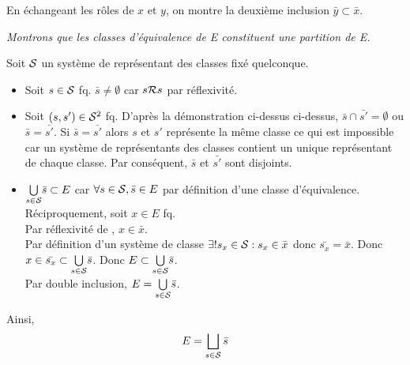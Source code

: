 \documentclass{article}
\renewenvironment{question_kholle}[2][ ]
{
	\subsection{\texorpdfstring{#2}{}}
	\notblank{#1}
	{
		\noindent #1
		\bigbreak
	}
	{}
	\begin{proof}
}
{
	\end{proof}
}
\begin{document}
\begin{question_kholle}
\begin{itemize}[label=\textemdash]
          En échangeant les rôles de $x$ et $y$, on montre la deuxième inclusion $\bar{y} \subset \bar{x}$.
  \end{itemize}
  \bigbreak

  \textit{Montrons que les classes d'équivalence de E constituent une partition de E.}

  Soit $\mathcal S$ un système de représentant des classes fixé quelconque.

  \begin{itemize}[label=\textemdash]
    \item Soit $s\in \mathcal S$ fq. $\bar{s} \neq \emptyset$ car $s \mathcal R s$ par réflexivité.
    \item Soit $(s, s') \in \mathcal S^2$ fq. D'après la démonstration ci-dessus ci-dessus, $\bar{s} \cap \bar{s'} = \emptyset$ ou $\bar{s} = \bar{s'}$. Si $\bar{s} = \bar{s'}$ alors $s$ et $s'$ représente la même classe ce qui est impossible car un système de représentants des classes contient un unique représentant de chaque classe. Par conséquent, $\bar{s}$ et $\bar{s'}$ sont disjoints.
    \item $\underset{s \in \mathcal S}{\bigcup} \bar{s} \subset E$ car $\forall s \in \mathcal S, \bar{s} \in E$ par définition d'une classe d'équivalence. \\
          Réciproquement, soit $x \in E$ fq. \\
          Par réflexivité de \Rel, $x \in \bar{x}$. \\
          Par définition d'un système de classe $\exists ! s_x \in \mathcal S : s_x \in \bar{x}$ donc $\bar{s_x} = \bar{x}$. Donc $x \in \bar{s_x} \subset \underset{s \in \mathcal S}{\bigcup} \bar{s}$. Donc $E \subset \underset{s \in \mathcal S}{\bigcup} \bar{s}$. \\
          Par double inclusion, $E = \underset{s \in \mathcal S}{\bigcup} \bar{s}$.
  \end{itemize}

  Ainsi,
  \begin{equation}
    E = \bigsqcup_{s \in \mathcal S} \bar{s}
  \end{equation}

\end{question_kholle}
\end{document}

